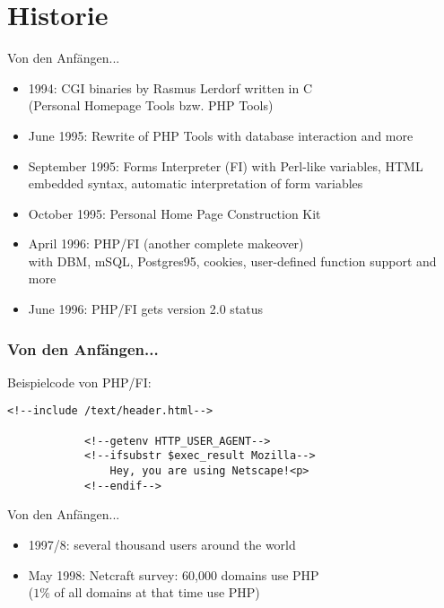 \documentclass{beamer}
\begin{document}
	\section{Historie}
	\begin{frame}{Von den Anfängen...}
		\begin{itemize}
			\item 1994: CGI binaries by Rasmus Lerdorf written in C \\ (Personal Homepage Tools bzw. PHP Tools)
			\item June 1995: Rewrite of PHP Tools with database interaction and more
			\item September 1995: Forms Interpreter (FI) with Perl-like variables, HTML embedded syntax, automatic interpretation of form variables
			\item October 1995: Personal Home Page Construction Kit
			\item April 1996: PHP/FI (another complete makeover) \\
			with DBM, mSQL, Postgres95, cookies, user-defined function support and more
			\item June 1996: PHP/FI gets version 2.0 status
		\end{itemize}
	\end{frame}
	
	\begin{frame}[fragile]
		\frametitle{Von den Anfängen...}
		Beispielcode von PHP/FI:
		\begin{lstlisting}[commentstyle=\color{mygreen},%
		deletekeywords={header},%
		morekeywords={ifsubstr,endif}]
			<!--include /text/header.html-->
		
			<!--getenv HTTP_USER_AGENT-->
			<!--ifsubstr $exec_result Mozilla-->
			    Hey, you are using Netscape!<p>
			<!--endif-->
		\end{lstlisting}
	\end{frame}
	
	\begin{frame}{Von den Anfängen...}
		\begin{itemize}
			\item 1997/8: several thousand users around the world
			\item May 1998: Netcraft survey: 60,000 domains use PHP \\ ($1\%$ of all domains at that time use PHP)
		\end{itemize}
	\end{frame}
	
\end{document}
